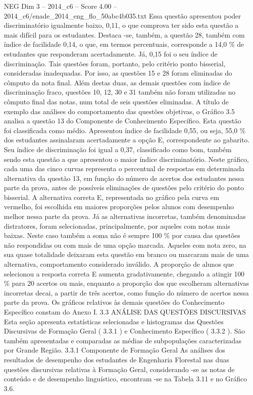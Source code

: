 \begin{textsample}{NEG Dim 3 – 2014\_c6 – Score 4.00 – 2014\_c6/enade\_2014\_eng\_flo\_50abc4b035.txt}
Essa questão apresentou poder discriminatório igualmente baixo, 0,11, o que comprova ter sido esta questão a mais difícil para os estudantes.
Destaca -se, também, a questão 28, também com índice de facilidade 0,14, o que, em termos percentuais, corresponde a 14,0 \% de estudantes que responderam acertadamente.
Já, 0,15 foi o seu índice de discriminação.
Tais questões foram, portanto, pelo critério ponto bisserial, consideradas inadequadas.
Por isso, as questões 15 e 28 foram eliminadas do cômputo da nota final.
Além destas duas, as demais questões com índice de discriminação fraco, questões 10, 12, 30 e 31 também não foram utilizadas no cômputo final das notas, num total de seis questões eliminadas.
A título de exemplo das análises do comportamento das questões objetivas, o Gráfico 3.5 analisa a questão 13 do Componente de Conhecimento Específico.
Esta questão foi classificada como médio.
Apresentou índice de facilidade 0,55, ou seja, 55,0 \% dos estudantes assinalaram acertadamente a opção E, correspondente ao gabarito.
Seu índice de discriminação foi igual a 0,37, classificado como bom, também sendo esta questão a que apresentou o maior índice discriminatório.
Neste gráfico, cada uma das cinco curvas representa o percentual de respostas em determinada alternativa da questão 13, em função do número de acertos dos estudantes nessa parte da prova, antes de possíveis eliminações de questões pelo critério do ponto bisserial.
A alternativa correta E, representada no gráfico pela curva em vermelho, foi escolhida em maiores proporções pelos alunos com desempenho melhor nessa parte da prova.
Já as alternativas incorretas, também denominadas distratores, foram selecionadas, principalmente, por aqueles com notas mais baixas.
Neste caso também a soma não é sempre 100 \% por causa das questões não respondidas ou com mais de uma opção marcada.
Aqueles com nota zero, na sua quase totalidade deixaram esta questão em branco ou marcaram mais de uma alternativa, comportamento considerado inválido.
A proporção de alunos que selecionou a resposta correta E aumenta gradativamente, chegando a atingir 100 \% para 20 acertos ou mais, enquanto a proporção dos que escolheram alternativas incorretas decai, a partir de três acertos, como função do número de acertos nessa parte da prova.
Os gráficos relativos às demais questões do Conhecimento Específico constam do Anexo I. 3.3 ANÁLISE DAS QUESTÕES DISCURSIVAS Esta seção apresenta estatísticas selecionadas e histogramas das Questões Discursivas de Formação Geral ( 3.3.1 ) e Conhecimento Específico ( 3.3.2 ).
São também apresentadas e comparadas as médias de subpopulações caracterizadas por Grande Região. 3.3.1 Componente de Formação Geral As análises dos resultados de desempenho dos estudantes de Engenharia Florestal nas duas questões discursivas relativas à Formação Geral, considerando -se as notas de conteúdo e de desempenho linguístico, encontram -se na Tabela 3.11 e no Gráfico 3.6.

\end{textsample}
